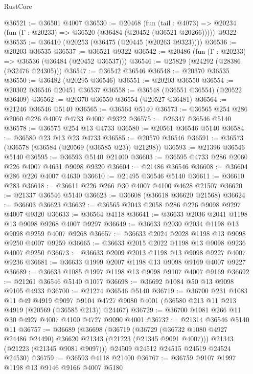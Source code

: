 \begin{lexlean}{RustCore}
\begin{coremodule}
@36521 := @36501 @4007
@36530 := @20468
    (fun (tail : @4073) => @20234 (fun (Γ : @20233) => @36520 (@36484 (@20452 (@36521 @20266)))))
    @9322
@36535 := @36410 (@20253 (@36475 (@20445 (@20263 @9323))))
@36536 := @20203 @36535
@36537 := @36521 @9322
@36542 := @20486 (fun (Γ : @20233) => @36536 (@36484 (@20452 @36537)))
@36546 := @25829 (@24292 (@28386 (@32476 @24305)))
@36547 := @36542 @36546
@36548 := @20370 @36535
@36550 := @36482 (@20295 @36546)
@36551 := @20203 @36550
@36554 := @20302 @36546 @20451 @36537
@36558 := @36548 (@36551 @36554) (@20522 @36409)
@36562 := @20370 @36550 @36554 (@20527 @36481)
@36564 := @21246 @36546 @5140
@36565 := @36564 @5140
@36573 := @36565 @254 @286 @2060 @226 @4007 @4733 @4007 @9322
@36575 := @26347 @36546 @5140
@36578 := @36575 @254 @13 @4733
@36580 := @20561 @36546 @5140
@36584 := @36580 @23 @13 @23 @4733
@36585 := @20570 @36546
@36591 := @36573 (@36578 (@36584 (@20569 (@36585 @23)) @21298))
@36593 := @21396 @36546 @5140
@36595 := @36593 @5140 @21400
@36603 := @36595 @4733 @286 @2060 @226 @4007 @4631 @9098 @9320
@36604 := @21486 @36546
@36608 := @36604 @286 @226 @4007 @4630
@36610 := @21495 @36546 @5140
@36611 := @36610 @283
@36618 := @36611 @226 @266 @30 @4007 @4100 @4628 @21507
@36620 := @21337 @36546 @5140
@36623 := @36608 (@36618 @36620 @21568)
@36624 := @36603 @36623
@36632 := @36565 @2043 @2058 @286 @226 @9098 @9297 @4007 @9320
@36633 := @36564 @4118
@36641 := @36633 @2036 @2041 @1198 @13 @9098 @9268 @4007 @9297
@36649 := @36633 @2030 @2034 @1198 @13 @9098 @9259 @4007 @9268
@36657 := @36633 @2024 @2028 @1198 @13 @9098 @9250 @4007 @9259
@36665 := @36633 @2015 @2022 @1198 @13 @9098 @9236 @4007 @9250
@36673 := @36633 @2009 @2013 @1198 @13 @9098 @9227 @4007 @9236
@36681 := @36633 @1999 @2007 @1198 @13 @9098 @9169 @4007 @9227
@36689 := @36633 @1085 @1997 @1198 @13 @9098 @9107 @4007 @9169
@36692 := @21261 @36546 @5140 @1077
@36698 := @36692 @1084 @50 @13 @9098 @9105 @4933
@36700 := @21274 @36546 @5140
@36719 := @36700
    @231
    @1083
    @11
    @49
    @4919
    @9097
    @9104
    @4727
    @9080
    @4001
    (@36580 @213 @11 @213 @4919 (@20569 (@36585 @213)) @24467)
@36729 := @36700 @1081 @266 @11 @30 @4927 @4007 @4100 @4727 @9090 @4001
@36732 := @21314 @36546 @5140 @11
@36757 := @36689
    (@36698
      (@36719
        (@36729 (@36732 @1080 @4927 @24486 @24490) @36620 @21343 (@21223 (@21345 @9091 @4007)))
        @21343
        (@21223 (@21345 @9081 @9097)))
      @24509
      @24512
      @24515
      @24519
      @24524
      @24530)
@36759 := @36593 @4118 @21400
@36767 := @36759 @9107 @1997 @1198 @13 @9146 @9166 @4007 @5180

\end{coremodule}
\end{lexlean}
